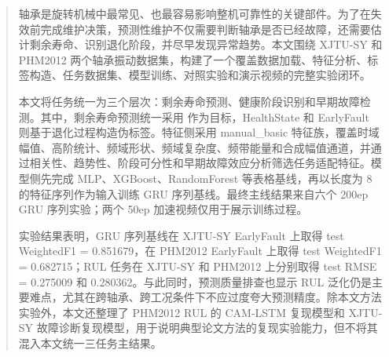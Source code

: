 \begin{abstract}
轴承是旋转机械中最常见、也最容易影响整机可靠性的关键部件。为了在失效前完成维护决策，预测性维护不仅需要判断轴承是否已经故障，还需要估计剩余寿命、识别退化阶段，并尽早发现异常趋势。本文围绕 XJTU-SY 和 PHM2012 两个轴承振动数据集，构建了一个覆盖数据加载、特征分析、标签构造、任务数据集、模型训练、对照实验和演示视频的完整实验闭环。

本文将任务统一为三个层次：剩余寿命预测、健康阶段识别和早期故障检测。其中，剩余寿命预测统一采用  作为目标，HealthState 和 EarlyFault 则基于退化过程构造伪标签。特征侧采用 manual\_basic 特征族，覆盖时域幅值、高阶统计、频域形状、频域复杂度、频带能量和合成幅值通道，并通过相关性、趋势性、阶段可分性和早期故障效应分析筛选任务适配特征。模型侧先完成 MLP、XGBoost、RandomForest 等表格基线，再以长度为 8 的特征序列作为输入训练 GRU 序列基线。最终主线结果来自六个 200ep GRU 序列实验；两个 50ep 加速视频仅用于展示训练过程。

实验结果表明，GRU 序列基线在 XJTU-SY EarlyFault 上取得 test WeightedF1 = 0.851679，在 PHM2012 EarlyFault 上取得 test WeightedF1 = 0.682715；RUL 任务在 XJTU-SY 和 PHM2012 上分别取得 test RMSE = 0.275009 和 0.280362。与此同时，预测质量排查也显示 RUL 泛化仍是主要难点，尤其在跨轴承、跨工况条件下不应过度夸大预测精度。除本文方法实验外，本文还整理了 PHM2012 RUL 的 CAM-LSTM 复现模型和 XJTU-SY 故障诊断复现模型，用于说明典型论文方法的复现实验能力，但不将其混入本文统一三任务主结果。
\end{abstract}

\newpage
